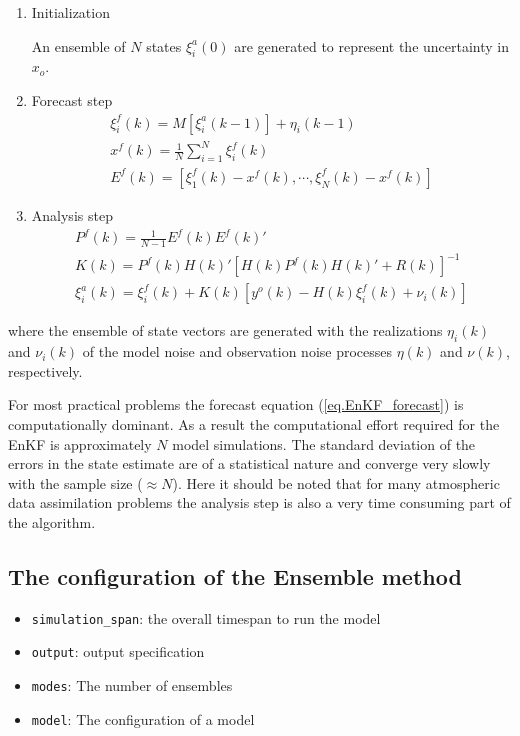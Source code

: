 \begin{enumerate}
\item Initialization

An ensemble of $N$ states $\xi^a_i(0)$ are generated to represent the
uncertainty in $x_o$.

\item Forecast step
  \begin{eqnarray}
    \xi_i^f(k)=M[\xi_i^a(k-1)] + \eta_i(k-1) \label{eq.EnKF_forecast} \\
    x^f(k)=\frac{1}{N} \sum_{i=1}^N \xi_i^f(k) \\
    E^f(k)=[\xi_1^f(k)-x^f(k),\cdots,\xi_N^f(k)-x^f(k)]
  \end{eqnarray}

\item Analysis step
  \begin{eqnarray}
    P^f(k)=\frac{1}{N-1}E^f(k)E^f(k)' \\
    K(k) = P^f(k)H(k)'[H(k)P^f(k)H(k)'+R(k)]^{-1} \\
    \xi^a_i(k) = \xi^f_i(k) + K(k) [y^o(k) - H(k) \xi^f_i(k) + \nu_i(k)]
  \end{eqnarray}
\end{enumerate}
where the ensemble of state vectors are generated with the realizations
$\eta_i(k)$ and $\nu_i(k)$ of the model noise and observation noise processes
$\eta(k)$ and $\nu(k)$, respectively.

For most practical problems the forecast equation (\ref{eq.EnKF_forecast}) is
computationally dominant. As a result the computational effort required for the
EnKF is approximately $N$ model simulations. The standard deviation of the
errors in the state estimate are of a statistical nature and converge very
slowly with the sample size ($\approx N$). Here it should be noted that for
many atmospheric data assimilation problems the analysis step is also a very
time consuming part of the algorithm.



\subsection{The configuration of the Ensemble method}
\begin{itemize}
\item {\tt simulation\_span}: the overall timespan to run the model
\item {\tt output}: output specification
\item {\tt modes}: The number of ensembles
\item {\tt model}: The configuration of a model
\end{itemize}

